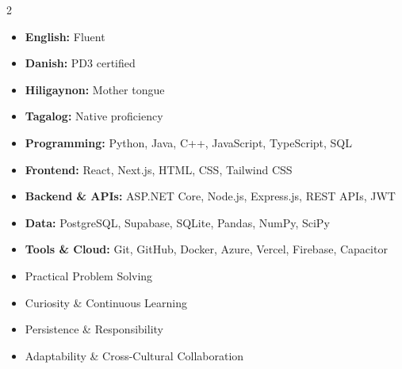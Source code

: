 \documentclass[10pt,a4paper,ragged2e,withhyper]{altacv}
\begin{document}

\makecvheader %

\begin{paracol}{2}
\begin{leftcolumn}

\begin{itemize}
  \item \textbf{English:} Fluent
  \item \textbf{Danish:} PD3 certified
  \item \textbf{Hiligaynon:} Mother tongue
  \item \textbf{Tagalog:} Native proficiency
\end{itemize}

\divider

{\renewcommand{\cvsectionfont}{\Large\bfseries}}
\begin{itemize}
  \item \textbf{Programming:} Python, Java, C++, JavaScript, TypeScript, SQL
  \item \textbf{Frontend:} React, Next.js, HTML, CSS, Tailwind CSS
  \item \textbf{Backend \& APIs:} ASP.NET Core, Node.js, Express.js, REST APIs, JWT
  \item \textbf{Data:} PostgreSQL, Supabase, SQLite, Pandas, NumPy, SciPy
  \item \textbf{Tools \& Cloud:} Git, GitHub, Docker, Azure, Vercel, Firebase, Capacitor
\end{itemize}

\divider

\begin{itemize}
  \item Practical Problem Solving
  \item Curiosity \& Continuous Learning
  \item Persistence \& Responsibility
  \item Adaptability \& Cross-Cultural Collaboration
\end{itemize}

\divider



\end{leftcolumn}
\end{paracol}
\end{document}
